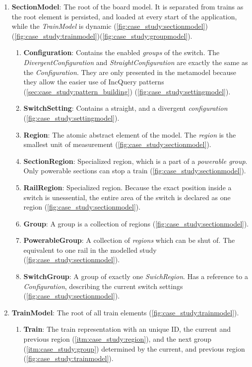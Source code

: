 \begin{enumerate}
	\item \textbf{SectionModel}: The root of the board model. It is separated from trains as the root element is persisted, and loaded at every start of the application, while the \emph{TrainModel} is dynamic (\cref{fig:case_study:sectionmodel})(\cref{fig:case_study:trainmodel})(\cref{fig:case_study:groupmodel}).
	\begin{enumerate}
		\item \textbf{Configuration}: Contains the enabled \emph{groups} of the switch. The \emph{DivergentConfiguration} and \emph{StraightConfiguration} are exactly the same as the \emph{Configuration}. They are only presented in the metamodel because they allow the easier use of IncQuery patterns (\cref{sec:case_study:pattern_building}) (\cref{fig:case_study:settingmodel}).
		\item \textbf{SwitchSetting}: Contains a straight, and a divergent \emph{configuration} (\cref{fig:case_study:settingmodel}).
		\item \label{itm:case_study:region} \textbf{Region}: The atomic abstract element of the model. The \emph{region} is the smallest unit of measurement (\cref{fig:case_study:sectionmodel}).
		\item \textbf{SectionRegion}: Specialized region, which is a part of a \emph{powerable group}. Only powerable sections can stop a train (\cref{fig:case_study:sectionmodel}). 
		\item \textbf{RailRegion}: Specialized region. Because the exact position inside a switch is unessential, the entire area of the switch is declared as one region (\cref{fig:case_study:sectionmodel}).
		\item \label{itm:case_study:group} \textbf{Group}: A group is a collection of regions (\cref{fig:case_study:sectionmodel}).
		\item \textbf{PowerableGroup}: A collection of \emph{regions} which can be shut of. The equivalent to one rail in the modelled study (\cref{fig:case_study:sectionmodel}).
		\item \textbf{SwitchGroup}: A group of exactly one \emph{SwichRegion}. Has a reference to a \emph{Configuration}, describing the current switch settings (\cref{fig:case_study:sectionmodel}).
	\end{enumerate}
	\newpage
	\item \textbf{TrainModel}: The root of all train elements (\cref{fig:case_study:trainmodel}).
	\begin{enumerate}
		\item \textbf{Train}: The train representation with an unique ID, the current and previous region (\cref{itm:case_study:region}), and the next group (\cref{itm:case_study:group}) determined by the current, and previous region (\cref{fig:case_study:trainmodel}).
	\end{enumerate}
\end{enumerate}

